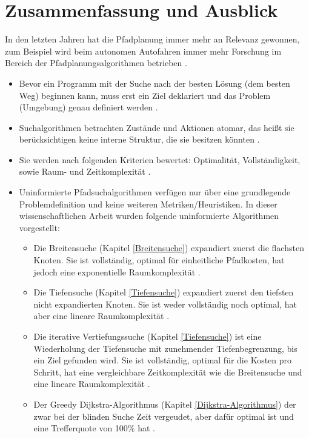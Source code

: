 \chapter{Zusammenfassung und Ausblick}
\label{Zusammenfassung und Ausblick}
In den letzten Jahren hat die Pfadplanung immer mehr an Relevanz gewonnen, zum Beispiel wird beim autonomen Autofahren immer mehr Forschung 
im Bereich der Pfadplanungsalgorithmen betrieben \cite{Karur:21}.
\noindent \\
\begin{itemize}
    \item Bevor ein Programm mit der Suche nach der besten Lösung (dem besten Weg) beginnen kann, muss erst ein Ziel deklariert und das Problem (Umgebung) genau definiert werden \cite[108,109]{Russell:10}.
    \item Suchalgorithmen betrachten Zustände und Aktionen atomar, das heißt sie berücksichtigen keine interne Struktur, die sie besitzen könnten \cite[108,109]{Russell:10}.
    \item Sie werden nach folgenden Kriterien bewertet: Optimalität, Vollständigkeit, sowie Raum- und Zeitkomplexität \cite[80]{Russell:10}.
    \item Uninformierte Pfadsuchalgorithmen verfügen nur über eine grundlegende Problemdefinition und keine weiteren Metriken/Heuristiken. In dieser wissenschaftlichen Arbeit wurden folgende uninformierte Algorithmen vorgestellt:
    \begin{itemize}
        \item Die Breitensuche (Kapitel \ref{Breitensuche}) expandiert zuerst die flachsten Knoten. Sie ist vollständig, optimal für einheitliche Pfadkosten, hat jedoch eine exponentielle Raumkomplexität \cite[81]{Russell:10}.
        \item Die Tiefensuche (Kapitel \ref{Tiefensuche}) expandiert zuerst den tiefsten nicht expandierten Knoten. Sie ist weder vollständig noch optimal, hat aber eine lineare Raumkomplexität \cite[85,86]{Russell:10}.
        \item Die iterative Vertiefungssuche (Kapitel \ref{Tiefensuche}) ist eine Wiederholung der Tiefensuche mit zunehmender Tiefenbegrenzung, bis ein Ziel gefunden wird. Sie ist vollständig, optimal für die Kosten pro Schritt, hat eine vergleichbare Zeitkomplexität wie die Breitensuche und eine lineare Raumkomplexität \cite[85,86]{Russell:10}.
        \item Der Greedy Dijkstra-Algorithmus (Kapitel \ref{Dijkstra-Algorithmus}) der zwar bei der blinden Suche Zeit vergeudet, aber dafür optimal ist und eine Trefferquote von 100\% hat \cite{Karur:21}.

\end{itemize}
\end{itemize}
